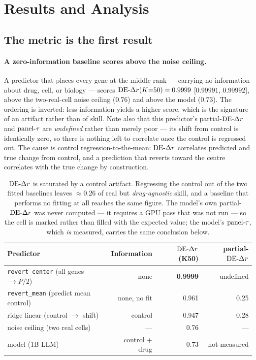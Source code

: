 \section{Results and Analysis}
\label{sec:results}

\subsection{The metric is the first result}
\label{sec:res-metrics}

\paragraph{A zero-information baseline scores above the noise ceiling.} A predictor that places
every gene at the middle rank --- carrying no information about drug, cell, or biology --- scores
$\textrm{DE-}\Delta r(K{=}50) = 0.9999$ [$0.99991$, $0.99992$], above the two-real-cell noise ceiling ($0.76$) and
above the model ($0.73$). The ordering is inverted: less information yields a higher score, which is
the signature of an artifact rather than of skill. Note also that this predictor's partial-$\textrm{DE-}\Delta r$
and $\textrm{panel-}\tau$ are \emph{undefined} rather than merely poor --- its shift from control is
identically zero, so there is nothing left to correlate once the control is regressed out. The cause is control regression-to-the-mean: $\textrm{DE-}\Delta r$ correlates
predicted and true change from control, and a prediction that reverts toward the centre correlates
with the true change by construction.

\begin{table}[h]
\centering
\begin{tabular}{lrrr}
\toprule
Predictor & Information & $\textrm{DE-}\Delta r$ (K50) & partial-$\textrm{DE-}\Delta r$ \\
\midrule
\texttt{revert\_center} (all genes $\rightarrow P/2$) & none & \textbf{0.9999} & undefined \\
\texttt{revert\_mean} (predict mean control) & none, no fit & 0.961 & 0.25 \\
ridge linear (control $\rightarrow$ shift) & control & 0.947 & 0.28 \\
noise ceiling (two real cells) & --- & 0.76 & --- \\
model (1B LLM) & control + drug & 0.73 & not measured \\
\bottomrule
\end{tabular}
\caption{$\textrm{DE-}\Delta r$ is saturated by a control artifact. Regressing the control out of the two fitted
baselines leaves $\approx 0.26$ of real but \emph{drug-agnostic} skill, and a baseline that performs
no fitting at all reaches the same figure. The model's own partial-$\textrm{DE-}\Delta r$ was never computed --- it
requires a GPU pass that was not run --- so the cell is marked rather than filled with the expected
value; the model's $\textrm{panel-}\tau$, which \emph{is} measured, carries the same conclusion below.}
\label{tab:de-artifact}
\end{table}

